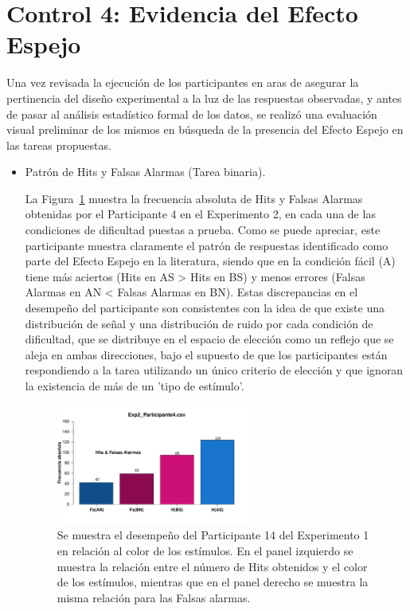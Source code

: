 \section{Control 4: Evidencia del Efecto Espejo}

Una vez revisada la ejecución de los participantes en aras de asegurar la pertinencia del diseño experimental a la luz de las respuestas observadas, y antes de pasar al análisis estadístico formal de los datos, se realizó una evaluación visual preliminar de los mismos en búsqueda de la presencia del Efecto Espejo en las tareas propuestas.

\begin{itemize}
\item Patrón de Hits y Falsas Alarmas (Tarea binaria).

La Figura~\ref{fig:MirrorRate_E2_P4} muestra la frecuencia absoluta de Hits y Falsas Alarmas obtenidas por el Participante 4 en el Experimento 2, en cada una de las condiciones de dificultad puestas a prueba. Como se puede apreciar, este participante muestra claramente el patrón de respuestas identificado como parte del Efecto Espejo en la literatura, siendo que en la condición fácil (A) tiene más aciertos (Hits en AS > Hits en BS) y menos errores (Falsas Alarmas en AN < Falsas Alarmas en BN). Estas discrepancias en el desempeño del participante son consistentes con la idea de que existe una distribución de señal y una distribución de ruido por cada condición de dificultad, que se distribuye en el espacio de elección como un reflejo que se aleja en ambas direcciones, bajo el supuesto de que los participantes están respondiendo a la tarea utilizando un único criterio de elección y que ignoran la existencia de más de un 'tipo de estímulo'.\\

\begin{figure}[th]
\centering
\includegraphics[width=0.60\textwidth]{Figures/MirrorRate_Exp2_P4}
\caption[Diferencias entre Hits y Falsas Alarmas por Condición; Ejemplo]{Se muestra el desempeño del Participante 14 del Experimento 1 en relación al color de los estímulos. En el panel izquierdo se muestra la relación entre el número de Hits obtenidos y el color de los estímulos, mientras que en el panel derecho se muestra la misma relación para las Falsas alarmas.}
\label{fig:MirrorRate_E2_P4}
\end{figure}


\end{itemize}
